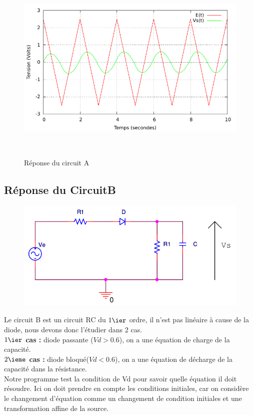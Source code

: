 \documentclass[a4paper,11pt]{article}
\begin{document}
\begin{figure}[h!]
\begin{minipage}[b]{0.5\linewidth}
   \end{minipage}
  \begin{minipage}[b]{0.5\linewidth}   
      \centering \includegraphics[scale=.68]{CAtriangle.pdf}
   \end{minipage}\\
 \caption{Réponse du circuit A}
\end{figure}

\newpage
  \subsection{Réponse du CircuitB}
  
\begin{figure}[H]
	 \begin{center}
	\includegraphics[scale=.5]{circuitB}
	\end{center}
      \end{figure}
   Le circuit B est un circuit RC du $1\ier$ ordre, il n'est pas linéaire à cause de la diode, nous devons donc l'étudier dans 2 cas.\\
   \textbf{$1\ier$ cas :} diode passante ($Vd > 0.6$), on a une équation de charge de la capacité.\\
   \textbf{$2\ieme$ cas :} diode bloqué($Vd < 0.6$), on a une équation de décharge de la capacité dans la résistance.\\
   Notre programme test la condition de Vd pour savoir quelle équation il doit résoudre. Ici on doit prendre en compte les conditions initiales,
  car on considère le changement d'équation comme un changement de condition initiales et une transformation affine de la source.
\end{document}
